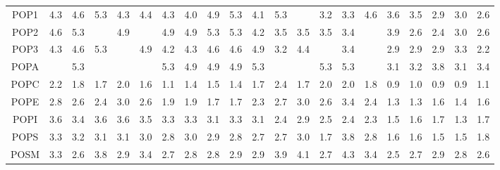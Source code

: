 \documentclass[preprint,3p,9pt,times,onecolumn]{elsarticle}
\begin{document}
\begin{table}
{\begin{tabular}{| c || cccccccccccccccccccc |}
POP1    & 4.3        & 4.6        & 5.3        & 4.3        & 4.4        & 4.3        & 4.0        & 4.9        & 5.3        & 4.1        & 5.3        &            & 3.2        & 3.3        & 4.6        & 3.6        & 3.5        & 2.9        & 3.0        & 2.6        \\
POP2    & 4.6        & 5.3        &            & 4.9        &            & 4.9        & 4.9        & 5.3        & 5.3        & 4.2        & 3.5        & 3.5        & 3.5        & 3.4        &            & 3.9        & 2.6        & 2.4        & 3.0        & 2.6        \\
POP3    & 4.3        & 4.6        & 5.3        &            & 4.9        & 4.2        & 4.3        & 4.6        & 4.6        & 4.9        & 3.2        & 4.4        &            & 3.4        &            & 2.9        & 2.9        & 2.9        & 3.3        & 2.2        \\
POPA    &            & 5.3        &            &            &            & 5.3        & 4.9        & 4.9        & 4.9        & 5.3        &            &            & 5.3        & 5.3        &            & 3.1        & 3.2        & 3.8        & 3.1        & 3.4        \\
POPC    & 2.2        & 1.8        & 1.7        & 2.0        & 1.6        & 1.1        & 1.4        & 1.5        & 1.4        & 1.7        & 2.4        & 1.7        & 2.0        & 2.0        & 1.8        & 0.9        & 1.0        & 0.9        & 0.9        & 1.1        \\
POPE    & 2.8        & 2.6        & 2.4        & 3.0        & 2.6        & 1.9        & 1.9        & 1.7        & 1.7        & 2.3        & 2.7        & 3.0        & 2.6        & 3.4        & 2.4        & 1.3        & 1.3        & 1.6        & 1.4        & 1.6        \\
POPI    & 3.6        & 3.4        & 3.6        & 3.6        & 3.5        & 3.3        & 3.3        & 3.1        & 3.3        & 3.1        & 2.4        & 2.9        & 2.5        & 2.4        & 2.3        & 1.5        & 1.6        & 1.7        & 1.3        & 1.7        \\
POPS    & 3.3        & 3.2        & 3.1        & 3.1        & 3.0        & 2.8        & 3.0        & 2.9        & 2.8        & 2.7        & 2.7        & 3.0        & 1.7        & 3.8        & 2.8        & 1.6        & 1.6        & 1.5        & 1.5        & 1.8        \\
POSM    & 3.3        & 2.6        & 3.8        & 2.9        & 3.4        & 2.7        & 2.8        & 2.8        & 2.9        & 2.9        & 3.9        & 4.1        & 2.7        & 4.3        & 3.4        & 2.5        & 2.7        & 2.9        & 2.8        & 2.6        \\

\end{tabular}}
\end{table}
\end{document}
